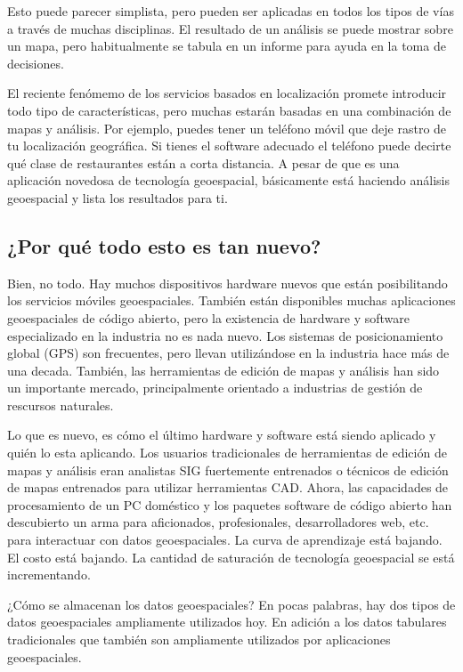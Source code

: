 Esto puede parecer simplista, pero pueden ser aplicadas en todos los tipos de
vías a través de muchas disciplinas. El resultado de un análisis se puede 
mostrar sobre un mapa, pero habitualmente se tabula en un informe para ayuda 
en la toma de decisiones.

El reciente fenómemo de los servicios basados en localización promete 
introducir todo tipo de características, pero muchas estarán basadas en una
combinación de mapas y análisis. Por ejemplo, puedes tener un teléfono móvil
que deje rastro de tu localización geográfica. Si tienes el software adecuado
el teléfono puede decirte qué clase de restaurantes están a corta distancia. 
A pesar de que es una aplicación novedosa de tecnología geoespacial, 
básicamente está haciendo análisis geoespacial y lista los resultados para ti.

\subsection{¿Por qué todo esto es tan nuevo?}\label{label_whynew}

Bien, no todo. Hay muchos dispositivos hardware nuevos que están posibilitando
los servicios móviles geoespaciales. También están disponibles muchas 
aplicaciones geoespaciales de código abierto, pero la existencia de hardware y 
software especializado en la industria no es nada nuevo.
Los sistemas de posicionamiento global (GPS) son frecuentes, pero llevan
utilizándose en la industria hace más de una decada. También, las herramientas
de edición de mapas y análisis han sido un importante mercado, principalmente 
orientado a industrias de gestión de rescursos naturales.

Lo que es nuevo, es cómo el último hardware y software está siendo aplicado
y quién lo esta aplicando. Los usuarios tradicionales de herramientas de 
edición de mapas y análisis eran analistas SIG fuertemente entrenados o 
técnicos de edición de mapas entrenados para utilizar herramientas CAD. 
Ahora, las capacidades de procesamiento de un PC doméstico y los paquetes software 
de código abierto han descubierto un arma para aficionados, profesionales,
desarrolladores web, etc. para interactuar con datos geoespaciales. La curva 
de aprendizaje está bajando. El costo está bajando. La cantidad de saturación 
de tecnología geoespacial se está incrementando.

¿Cómo se almacenan los datos geoespaciales? En pocas palabras, hay dos tipos
de datos geoespaciales ampliamente utilizados hoy. En adición a los datos 
tabulares tradicionales que también son ampliamente utilizados por 
aplicaciones geoespaciales.

